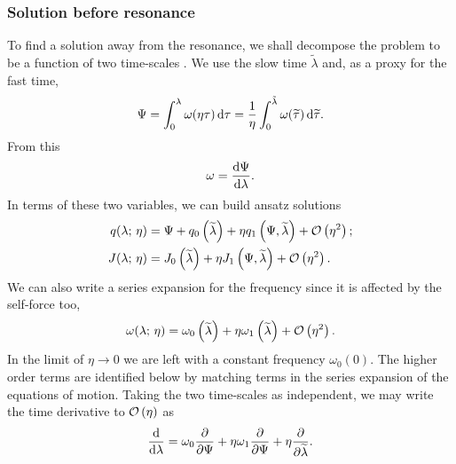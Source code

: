 \subsubsection{Solution before resonance}\label{sec:before-res}

To find a solution away from the resonance, we shall decompose the problem to be a function of two time-scales \citep{Kevorkian1971}. We use the slow time $\widetilde{\lambda}$ and, as a proxy for the fast time,
\begin{equation}
\Psi = \int_{0}^{\lambda}{\omega(\eta\tau)}\,\mathrm{d}{\tau} = \dfrac{1}{\eta}\int_{0}^{\tilde{\lambda}}{\omega(\widetilde{\tau})}\,\mathrm{d}{\widetilde{\tau}}.
\end{equation}
From this
\begin{equation}
\omega = \dfrac{\mathrm{d} {\Psi}}{\mathrm{d} {\lambda}}.
\end{equation}
In terms of these two variables, we can build ansatz solutions
\begin{subequations}
\begin{align}
\label{eq:q-series}
q(\lambda;\,\eta) = {} & \Psi + q_0\left(\widetilde{\lambda}\right) + \eta q_1\left(\Psi,\widetilde{\lambda}\right) + \mathcal{O}\left({\eta^2}\right); \\
J(\lambda;\,\eta) = {} & J_0\left(\widetilde{\lambda}\right) + \eta J_1\left(\Psi,\widetilde{\lambda}\right) + \mathcal{O}\left({\eta^2}\right).
\label{eq:J-series}
\end{align}
\end{subequations}
We can also write a series expansion for the frequency since it is affected by the self-force too,
\begin{equation}
\omega(\lambda;\,\eta) = \omega_0\left(\widetilde{\lambda}\right) + \eta \omega_1\left(\widetilde{\lambda}\right) + \mathcal{O}\left({\eta^2}\right).
\end{equation}
In the limit of $\eta \rightarrow 0$ we are left with a constant frequency $\omega_0(0)$. The higher order terms are identified below by matching terms in the series expansion of the equations of motion. Taking the two time-scales as independent, we may write the time derivative to $\mathcal{O}\left({\eta}\right)$ as
\begin{equation}
\dfrac{\mathrm{d}}{\mathrm{d} {\lambda}} = \omega_0\dfrac{\partial}{\partial {\Psi}} + \eta\omega_1\dfrac{\partial}{\partial {\Psi}} + \eta\dfrac{\partial}{\partial {\widetilde{\lambda}}}.
\end{equation}

